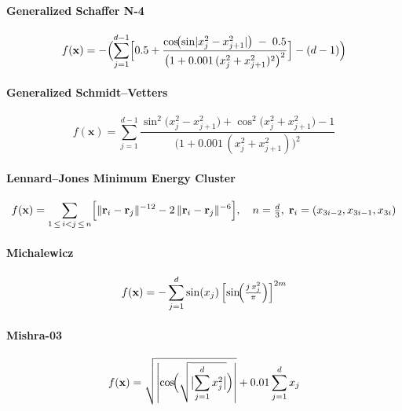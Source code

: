 \paragraph{Generalized Schaffer N-4}
\begin{equation}
f(\mathbf{x})
= -\Bigl(
    \sum_{j=1}^{d-1}
      \Bigl[
        0.5
        + \frac{\cos\!\bigl(\sin\lvert x_j^2 - x_{j+1}^2\rvert\bigr)\;-\;0.5}
               {\bigl(1 + 0.001\,(x_j^2 + x_{j+1}^2)^2\bigr)^{2}}
      \Bigr]
    - (d-1)
  \Bigr)
\label{ben:generalizedSchafferN4}
\end{equation}

\vspace{.095em}
\paragraph{Generalized Schmidt–Vetters}
\begin{equation}
f(\mathbf{x})
= \sum_{j=1}^{d-1}
  \frac{\sin^2\!\bigl(x_j^2 - x_{j+1}^2\bigr)
        + \cos^2\!\bigl(x_j^2 + x_{j+1}^2\bigr)
        - 1}
       {\bigl(1 + 0.001\,(x_j^2 + x_{j+1}^2)\bigr)^2}
\label{ben:generalizedSchmidtVetters}
\end{equation}

\vspace{.095em}
\paragraph{Lennard–Jones Minimum Energy Cluster}
\begin{equation}
f(\mathbf{x})
= \sum_{1 \,\le\, i < j \,\le\, n}
  \Bigl[\|\mathbf{r}_i - \mathbf{r}_j\|^{-12}
        - 2\,\|\mathbf{r}_i - \mathbf{r}_j\|^{-6}\Bigr],
\quad n = \tfrac{d}{3},\;\mathbf{r}_i=(x_{3i-2},x_{3i-1},x_{3i})
\label{ben:lennardJonesMinimumEnergyCluster}
\end{equation}

\vspace{.095em}
\paragraph{Michalewicz}
\begin{equation}
f(\mathbf{x})
= -\sum_{j=1}^{d}
    \sin(x_j)\,
    \Bigl[\sin\!\Bigl(\tfrac{j\,x_j^2}{\pi}\Bigr)\Bigr]^{2m}
\label{ben:michalewicz}
\end{equation}

\vspace{.095em}
\paragraph{Mishra-03}
\begin{equation}
f(\mathbf{x})
= \sqrt{\left|\cos\!\Bigl(\sqrt{\bigl|\sum_{j=1}^d x_j^2\bigr|}\Bigr)\right|}
  + 0.01 \sum_{j=1}^d x_j
\label{ben:Mishra03}
\end{equation}

